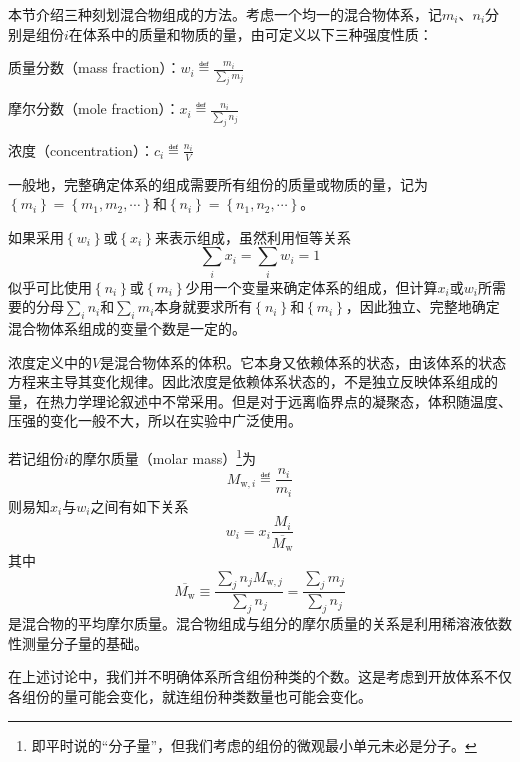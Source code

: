 \documentclass[main.tex]{subfiles}
\begin{document}
本节介绍三种刻划混合物组成的方法。考虑一个均一的混合物体系，记$m_i$、$n_i$分别是组份$i$在体系中的质量和物质的量，由可定义以下三种强度性质：

质量分数（mass fraction）：$w_i\eqdef\frac{m_i}{\sum_jm_j}$

摩尔分数（mole fraction）：$x_i\eqdef\frac{n_i}{\sum_jn_j}$

浓度（concentration）：$c_i\eqdef\frac{n_i}{V}$

一般地，完整确定体系的组成需要所有组份的质量或物质的量，记为$\left\{m_i\right\}=\left\{m_1,m_2,\cdots\right\}$和$\left\{n_i\right\}=\left\{n_1,n_2,\cdots\right\}$。

如果采用$\left\{w_i\right\}$或$\left\{x_i\right\}$来表示组成，虽然利用恒等关系
\[\sum_ix_i=\sum_iw_i=1\]
似乎可比使用$\left\{n_i\right\}$或$\left\{m_i\right\}$少用一个变量来确定体系的组成，但计算$x_i$或$w_i$所需要的分母$\sum_in_i$和$\sum_im_i$本身就要求所有$\left\{n_i\right\}$和$\left\{m_i\right\}$，因此独立、完整地确定混合物体系组成的变量个数是一定的。

浓度定义中的$V$是混合物体系的体积。它本身又依赖体系的状态，由该体系的状态方程来主导其变化规律。因此浓度是依赖体系状态的，不是独立反映体系组成的量，在热力学理论叙述中不常采用。但是对于远离临界点的凝聚态，体积随温度、压强的变化一般不大，所以在实验中广泛使用。

若记组份$i$的摩尔质量（molar mass）\footnote{即平时说的“分子量”，但我们考虑的组份的微观最小单元未必是分子。}为
\[M_{\text{w},i}\eqdef\frac{n_i}{m_i}\]
则易知$x_i$与$w_i$之间有如下关系
\[w_i=x_i\frac{M_i}{\overline{M_\text{w}}}\]
其中
\[\overline{M_\text{w}}\equiv\frac{\sum_jn_jM_{\text{w},j}}{\sum_jn_j}=\frac{\sum_jm_j}{\sum_jn_j}\]
是混合物的平均摩尔质量。混合物组成与组分的摩尔质量的关系是利用稀溶液依数性测量分子量的基础。

在上述讨论中，我们并不明确体系所含组份种类的个数。这是考虑到开放体系不仅各组份的量可能会变化，就连组份种类数量也可能会变化。
\end{document}
